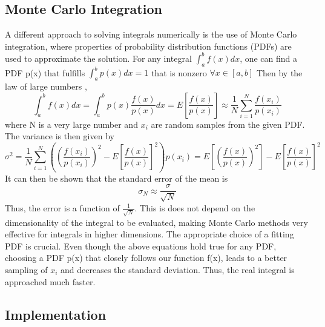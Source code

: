 \documentclass[10pt,a4paper]{article}
\begin{document}
\subsection{Monte Carlo Integration}
A different approach to solving integrals numerically is the use of Monte Carlo integration, where properties of probability distribution functions (PDFs) are used to approximate the solution. For any integral $\int_a^bf(x)dx$, one can find a PDF p(x) that fulfills  $\int_a^bp(x)dx=1$ that is nonzero $ \forall x\in [a,b]$ Then by the law of large numbers \cite{devore2012modern},
$$\int_a^bf(x)dx=\int_a^bp(x)\frac{f(x)}{p(x)}dx=E[\frac{f(x)}{p(x)}]\approx \frac{1}{N}\sum_{i=1}^{N}\frac{f(x_i)}{p(x_i)}$$
where N is a very large number and $x_i$ are random samples from the given PDF.\\
The variance is then given by
\[ 
\sigma^2=\frac{1}{N}\sum_{i=1}^{N}\left(\left( \frac{f(x_i)}{p(x_i)}\right)^2-E[\frac{f(x)}{p(x)}]^2\right) p(x_i)=E[ ( \frac{f(x)}{p(x)})^2]-E[\frac{f(x)}{p(x)}]^2
\]
It can then be shown \cite{devore2012modern} that the standard error of the mean is
$$
\sigma_N \approx \frac{\sigma}{\sqrt{N}}
$$
Thus, the error is a function of $\frac{1}{\sqrt{N}}$. This is does not depend on the dimensionality of the integral to be evaluated, making Monte Carlo methods very effective for integrals in higher dimensions.
The appropriate choice of a fitting PDF is crucial. Even though the above equations hold true for any PDF, choosing a PDF p(x) that closely follows our function f(x), leads to a better sampling of $x_i$ \cite{devore2012modern} and decreases the standard deviation. Thus, the real integral is approached much faster.

\subsection{Implementation}
\end{document}
